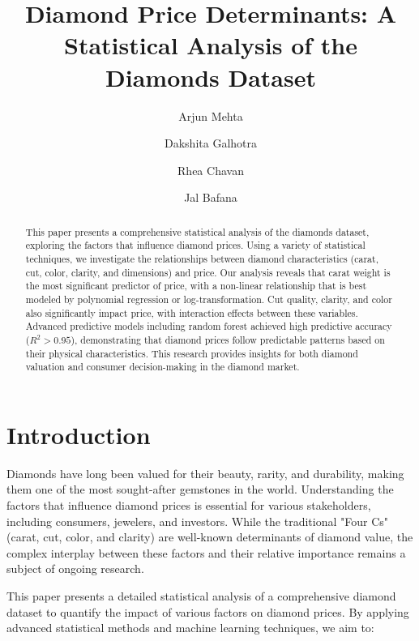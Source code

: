 \documentclass[11pt,a4paper]{article}
\begin{document}
\title{\textbf{Diamond Price Determinants: A Statistical Analysis of the Diamonds Dataset}}

\author[]{Arjun Mehta}
\author[]{Dakshita Galhotra}
\author[]{Rhea Chavan}
\author[]{Jal Bafana}


\maketitle

\begin{abstract}
This paper presents a comprehensive statistical analysis of the diamonds dataset, exploring the factors that influence diamond prices. Using a variety of statistical techniques, we investigate the relationships between diamond characteristics (carat, cut, color, clarity, and dimensions) and price. Our analysis reveals that carat weight is the most significant predictor of price, with a non-linear relationship that is best modeled by polynomial regression or log-transformation. Cut quality, clarity, and color also significantly impact price, with interaction effects between these variables. Advanced predictive models including random forest achieved high predictive accuracy ($R^2 > 0.95$), demonstrating that diamond prices follow predictable patterns based on their physical characteristics. This research provides insights for both diamond valuation and consumer decision-making in the diamond market.
\end{abstract}

\tableofcontents
\newpage

\section{Introduction}

Diamonds have long been valued for their beauty, rarity, and durability, making them one of the most sought-after gemstones in the world. Understanding the factors that influence diamond prices is essential for various stakeholders, including consumers, jewelers, and investors. While the traditional "Four Cs" (carat, cut, color, and clarity) are well-known determinants of diamond value, the complex interplay between these factors and their relative importance remains a subject of ongoing research.

This paper presents a detailed statistical analysis of a comprehensive diamond dataset to quantify the impact of various factors on diamond prices. By applying advanced statistical methods and machine learning techniques, we aim to:
\end{document}
